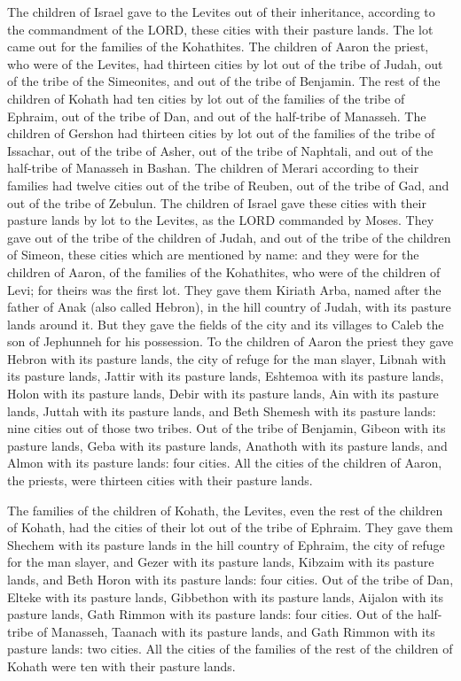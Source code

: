 \myverse{}The children of Israel gave to the Levites out of their inheritance,
according to the commandment of the LORD, these cities with their pasture lands.
\myverse{}The lot came out for the families of the Kohathites. The children of Aaron
the priest, who were of the Levites, had thirteen cities by lot out of the tribe of Judah, out of the
tribe of the Simeonites, and out of the tribe of Benjamin.
\myverse{}The rest of the children of Kohath had ten cities by lot out of the families
of the tribe of Ephraim, out of the tribe of Dan, and out of the half-tribe of Manasseh.
\myverse{}The children of Gershon had thirteen cities by lot out of the families of the
tribe of Issachar, out of the tribe of Asher, out of the tribe of Naphtali, and out of the half-tribe
of Manasseh in Bashan.
\myverse{}The children of Merari according to their families had twelve cities out of
the tribe of Reuben, out of the tribe of Gad, and out of the tribe of Zebulun.
\myverse{}The children of Israel gave these cities with their pasture lands by lot to
the Levites, as the LORD commanded by Moses.
\myverse{}They gave out of the tribe of the children of Judah, and out of the tribe of
the children of Simeon, these cities which are mentioned by name:
\myverse{}and they were for the children of Aaron, of the families of the Kohathites,
who were of the children of Levi; for theirs was the first lot.
\myverse{}They gave them Kiriath Arba, named after the father of Anak (also called
Hebron), in the hill country of Judah, with its pasture lands around it.
\myverse{}But they gave the fields of the city and its villages to Caleb the son of
Jephunneh for his possession.
\myverse{}To the children of Aaron the priest they gave Hebron with its pasture lands,
the city of refuge for the man slayer, Libnah with its pasture lands,
\myverse{}Jattir with its pasture lands, Eshtemoa with its pasture lands,
\myverse{}Holon with its pasture lands, Debir with its pasture lands,
\myverse{}Ain with its pasture lands, Juttah with its pasture lands, and Beth Shemesh
with its pasture lands: nine cities out of those two tribes.
\myverse{}Out of the tribe of Benjamin, Gibeon with its pasture lands, Geba with its
pasture lands,
\myverse{}Anathoth with its pasture lands, and Almon with its pasture lands: four cities.
\myverse{}All the cities of the children of Aaron, the priests, were thirteen cities
with their pasture lands.

\myverse{}The families of the children of Kohath, the Levites, even the
rest of the children of Kohath, had the cities of their lot out of the tribe of Ephraim.
\myverse{}They gave them Shechem with its pasture lands in the hill country of Ephraim,
the city of refuge for the man slayer, and Gezer with its pasture lands,
\myverse{}Kibzaim with its pasture lands, and Beth Horon with its pasture lands: four
cities.
\myverse{}Out of the tribe of Dan, Elteke with its pasture lands, Gibbethon with its
pasture lands,
\myverse{}Aijalon with its pasture lands, Gath Rimmon with its pasture lands: four
cities.
\myverse{}Out of the half-tribe of Manasseh, Taanach with its pasture lands, and Gath
Rimmon with its pasture lands: two cities.
\myverse{}All the cities of the families of the rest of the children of Kohath were
ten with their pasture lands.

